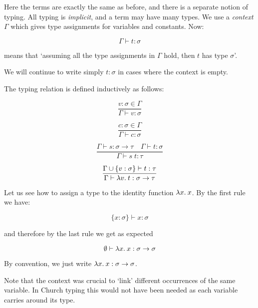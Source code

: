 \begin{slide*}


\vspace*{0.5cm}

Here the terms are exactly the same as before, and there is a separate notion
of typing. All typing is {\em implicit}, and a term may have many types. We use
a {\em context} {\red $\Gamma$} which gives type assignments for variables and
constants. Now:

{\red $$ \Gamma \vdash t : \sigma $$}

means that `assuming all the type assignments in {\red $\Gamma$} hold, then
{\red $t$} has type {\red $\sigma$}'.

We will continue to write simply {\red $t : \sigma$} in cases where the context
is empty.

\end{slide*}




\begin{slide*}


\vspace*{0.5cm}

The typing relation is defined inductively as follows:

\begin{red}
$$ \frac{v:\sigma \in \Gamma}{\Gamma \vdash v : \sigma} $$

$$ \frac{c:\sigma \in \Gamma}{\Gamma \vdash c : \sigma} $$

$$ \frac{\Gamma \vdash s : \sigma \to \tau \;\;\;\ \Gamma \vdash t : \sigma}
        {\Gamma \vdash s\; t : \tau} $$

$$ \frac{\Gamma \cup \{v:\sigma\} \vdash t:\tau}
        {\Gamma \vdash \lambda v.\: t : \sigma \to \tau} $$
\end{red}

\end{slide*}


\begin{slide*}


\vspace*{0.5cm}

Let us see how to assign a type to the identity function {\red $\lambda x.\: x$}.
By the first rule we have:

{\red $$ \{x:\sigma\} \vdash x:\sigma $$}

and therefore by the last rule we get as expected

{\red $$ \emptyset \vdash \lambda x.\: x : \sigma \to \sigma $$}

By convention, we just write {\red $\lambda x.\: x : \sigma \to \sigma$}.

Note that the context was crucial to `link' different occurrences of the same
variable. In Church typing this would not have been needed as each variable
carries around its type.

\end{slide*}




